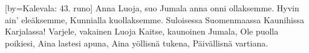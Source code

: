 [by={Kalevala: 43. runo}]
  \beginverse
    Anna Luoja, suo Jumala
    anna onni ollaksemme.
    Hyvin ain’ eleäksemme,
    Kunnialla kuollaksemme.
    Suloisessa Suomenmaassa
    Kaunihissa Karjalassa!
  \endverse
  \beginverse
    Varjele, vakainen Luoja
    Kaitse, kaunoinen Jumala,
    Ole puolla poikiesi,
    Aina lastesi apuna,
    Aina yöllisnä tukena,
    Päivällisnä vartiana.
  \endverse
\endsong


